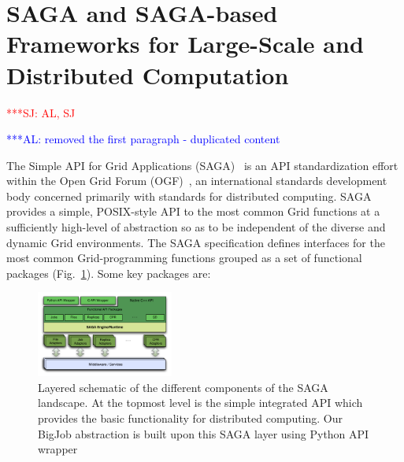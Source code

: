 \documentclass[conference,final]{IEEEtran}
\newcommand{\alnote}[1]{ {\textcolor{blue} { ***AL: #1 }}}
\newcommand{\jhanote}[1]{ {\textcolor{red} { ***SJ: #1 }}}
\newcommand{\alnote}[1]{}
\newcommand{\jhanote}[1]{}
\begin{document}


\section{SAGA and SAGA-based Frameworks for Large-Scale and
  Distributed Computation} \jhanote{AL, SJ}

\alnote{removed the first paragraph - duplicated content}

The Simple API for Grid Applications (SAGA)~\cite{saga_url}  is an API standardization
effort within the Open Grid Forum (OGF)~\cite{saga_gfd90}, an
international standards development body concerned primarily with
standards for distributed computing. SAGA provides a simple,
POSIX-style API to the most common Grid functions at a sufficiently
high-level of abstraction so as to be independent of the diverse and
dynamic Grid environments. The SAGA specification defines interfaces
for the most common Grid-programming functions grouped as a set of
functional packages (Fig.~\ref{Fig:SAGA1}). Some key packages are:

\begin{figure}[!ht]
 \begin{center}
     \includegraphics[width=0.40\textwidth]{stci_saga_figures-1.pdf}
 \end{center}
\caption{\small Layered schematic of the different components of the
   SAGA landscape. At the topmost level is the simple integrated API
   which provides the basic functionality for distributed
   computing. Our BigJob abstraction is built upon this SAGA layer
   using Python API wrapper} \label{Fig:SAGA1}
\end{figure}
\end{document}
